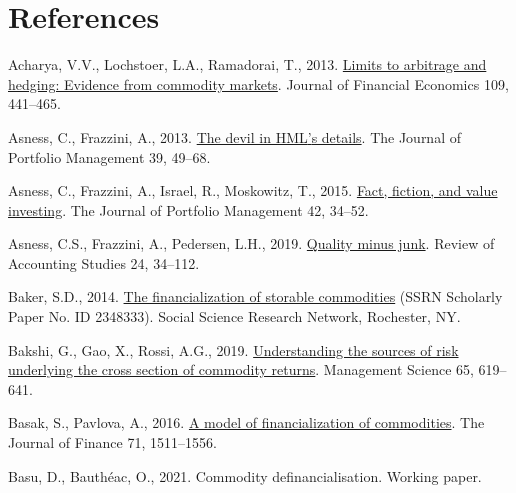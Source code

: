 \documentclass[]{elsarticle} %
\newlength{\cslhangindent}
\newlength{\cslentryspacingunit} %
\newenvironment{CSLReferences}[2] %
 {%
  \setlength{\parindent}{0pt}
  \ifodd #1
  \let\oldpar\par
  \def\par{\hangindent=\cslhangindent\oldpar}
  \fi
  \setlength{\parskip}{#2\cslentryspacingunit}
 }%
 {}
\begin{document}
\restoregeometry\newpage

\hypertarget{references}{%
\section*{References}\label{references}}

\hypertarget{refs}{}
\begin{CSLReferences}{1}{0}
\leavevmode{}%
Acharya, V.V., Lochstoer, L.A., Ramadorai, T., 2013. \href{https://doi.org/10.1016/j.jfineco.2013.03.003}{Limits to arbitrage and hedging: Evidence from commodity markets}. Journal of Financial Economics 109, 441--465.

\leavevmode{}%
Asness, C., Frazzini, A., 2013. \href{https://doi.org/10.3905/jpm.2013.39.4.049}{The devil in HML{'}s details}. The Journal of Portfolio Management 39, 49--68.

\leavevmode{}%
Asness, C., Frazzini, A., Israel, R., Moskowitz, T., 2015. \href{https://doi.org/10.3905/jpm.2015.42.1.034}{Fact, fiction, and value investing}. The Journal of Portfolio Management 42, 34--52.

\leavevmode{}%
Asness, C.S., Frazzini, A., Pedersen, L.H., 2019. \href{https://doi.org/10.1007/s11142-018-9470-2}{Quality minus junk}. Review of Accounting Studies 24, 34--112.

\leavevmode{}%
Baker, S.D., 2014. \href{https://doi.org/10.2139/ssrn.2348333}{The financialization of storable commodities} (SSRN Scholarly Paper No. ID 2348333). Social Science Research Network, Rochester, NY.

\leavevmode{}%
Bakshi, G., Gao, X., Rossi, A.G., 2019. \href{https://doi.org/10.1287/mnsc.2017.2840}{Understanding the sources of risk underlying the cross section of commodity returns}. Management Science 65, 619--641.

\leavevmode{}%
Basak, S., Pavlova, A., 2016. \href{https://doi.org/10.1111/jofi.12408}{A model of financialization of commodities}. The Journal of Finance 71, 1511--1556.

\leavevmode{}%
Basu, D., Bauthéac, O., 2021. Commodity definancialisation. Working paper.


\end{CSLReferences}
\end{document}
